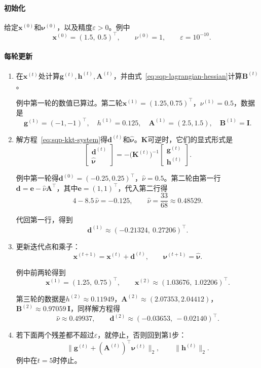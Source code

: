 \paragraph{初始化}
给定$\bm{x}^{(0)}$和$\bm{\nu}^{(0)}$，以及精度$\varepsilon>0$。例中
\[
 \bm{x}^{(0)}=(1.5,\ 0.5)^\top,\qquad \nu^{(0)}=1,\qquad\varepsilon=10^{-10}.
\]

\paragraph{每轮更新}
\begin{enumerate}
 \item 在$\bm{x}^{(t)}$处计算$\bm{g}^{(t)},\bm{h}^{(t)},\bm{A}^{(t)}$，并由式~\eqref{eq:sqp-lagrangian-hessian}计算$\bm{B}^{(t)}$。

 例中第一轮的数值已算过。第二轮$\bm{x}^{(1)}=(1.25,0.75)^\top$，$\nu^{(1)}=0.5$，数据是
 \[
  \bm{g}^{(1)}=(-1,-1)^\top,\quad h^{(1)}=0.125,\quad\bm{A}^{(1)}=(2.5,1.5),\quad\bm{B}^{(1)}=\bm{I}.
 \]

 \item 解方程~\eqref{eq:sqp-kkt-system}得$\bm{d}^{(t)}$和$\hat{\bm{\nu}}$。$\bm{K}$可逆时，它们的显式形式是
 \begin{equation}
  \begin{bmatrix}\bm{d}^{(t)}\\\hat{\bm{\nu}}\end{bmatrix}
  =-\bigl(\bm{K}^{(t)}\bigr)^{-1}\begin{bmatrix}\bm{g}^{(t)}\\\bm{h}^{(t)}\end{bmatrix}.
  \label{eq:sqp-full-step}
 \end{equation}

 例中第一轮得$\bm{d}^{(0)}=(-0.25,0.25)^\top$，$\hat\nu=0.5$。第二轮由第一行$\bm{d}=\bm{e}-\hat\nu\bm{A}^\top$，其中$\bm{e}=(1,1)^\top$，代入第二行得
 \[
  4-8.5\,\hat\nu=-0.125,\qquad\hat\nu=\frac{33}{68}\approx0.48529.
 \]

 代回第一行，得到
 \[
  \bm{d}^{(1)}\approx(-0.21324,\ 0.27206)^\top.
 \]

 \item 更新迭代点和乘子：
 \begin{equation}
  \bm{x}^{(t+1)}=\bm{x}^{(t)}+\bm{d}^{(t)},\qquad\bm{\nu}^{(t+1)}=\hat{\bm{\nu}}.
  \label{eq:sqp-full-update}
 \end{equation}

 例中前两轮得到
 \[
  \bm{x}^{(1)}=(1.25,\ 0.75)^\top,\qquad\bm{x}^{(2)}\approx(1.03676,\ 1.02206)^\top.
 \]

 第三轮的数据是$h^{(2)}\approx0.11949$，$\bm{A}^{(2)}\approx(2.07353,2.04412)$，$\bm{B}^{(2)}\approx0.97059\,\bm{I}$，同样解方程得
 \[
  \hat\nu\approx0.49937,\qquad\bm{d}^{(2)}\approx(-0.03653,\ -0.02140)^\top.
 \]

 \item 若下面两个残差都不超过$\varepsilon$，就停止，否则回到第1步：
 \[
  \lVert\bm{g}^{(t)}+(\bm{A}^{(t)})^\top\bm{\nu}^{(t)}\rVert_2,\qquad\lVert\bm{h}^{(t)}\rVert_2.
 \]
 例中在$t=5$时停止。
\end{enumerate}

